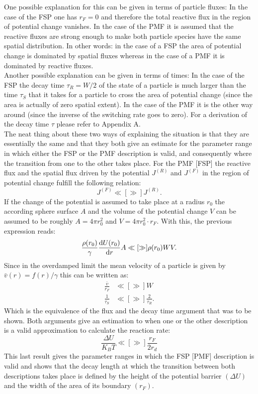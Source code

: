 One possible explanation for this can be given in terms of particle fluxes: In the case of the FSP one has $r_F=0$ and therefore the total reactive flux in the region of potential change vanishes. In the case of the PMF it is assumed that the reactive fluxes are strong enough to make both particle species have the same spatial distribution. In other words: in the case of a FSP the area of potential change is dominated by spatial fluxes whereas in the case of a PMF it is dominated by reactive fluxes.\\
Another possible explanation can be given in terms of times: In the case of the FSP the decay time $\tau_R = W/2$ of the state of a particle is much larger than the time $\tau_S$ that it takes for a particle to cross the area of potential change (since the area is actually of zero spatial extent). In the case of the PMF it is the other way around (since the inverse of the switching rate goes to zero). For a derivation of the decay time $\tau$ please refer to Appendix A.\\
The neat thing about these two ways of explaining the situation is that they are essentially the same and that they both give  an estimate for the parameter range in which either the FSP or the PMF description is valid, and consequently where the transition from one to the other takes place.
For the PMF [FSP] the reactive flux and the spatial flux driven by the potential $J^{(R)}$ and $J^{(F)}$ in the region of potential change fulfill the following relation:
\begin{equation}
    J^{(F)} \ll[\gg] J^{(R)}.
\end{equation}
If the change of the potential is assumed to take place at a radius $r_0$ the according sphere surface $A$ and the volume of the potential change $V$ can be assumed to be roughly $A=4 \pi r_0^2$ and $V=4 \pi r_0^2\cdot r_F$. With this, the previous expression reads:
\begin{equation}
    \frac{\rho(r_0)}{\gamma}\frac{{\rm d}U(r_0)}{{\rm d}r} A \ll[\gg]\rho(r_0) W V.
\end{equation}
    Since in the overdamped limit the mean velocity of a particle is given by $\bar{v}(r) = f(r)/\gamma$ this can be written as:
\begin{align}
    \frac{\bar{v}}{r_F} & \ll[\gg] W \nonumber \\
    \frac{1}{\tau_S} & \ll[\gg] \frac{2}{\tau_R}.
\end{align}
Which is the equivalence of the flux and the decay time argument that was to be shown.
Both arguments give an estimation to when one or the other description is a valid approximation to calculate the reaction rate:
\begin{equation}
    \frac{\Delta U}{K_B T} \ll[\gg] \frac{r_F}{2 r_d}
    \label{val_estimate}
\end{equation}
This last result gives the parameter ranges in which the FSP [PMF] description is valid and shows that the decay length at which the transition between both descriptions takes place is defined by the height of the potential barrier $(\Delta U)$ and the width of the area of its boundary $(r_F)$.

